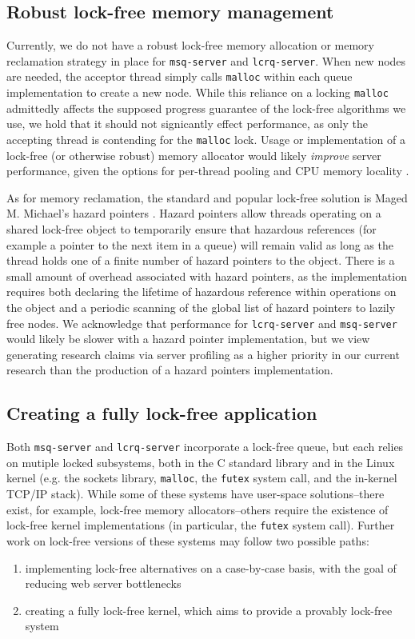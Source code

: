 \documentclass[twoside,10pt]{article}
\begin{document}
\begin{multicols}{2}
\subsection{Robust lock-free memory management}

Currently, we do not have a robust lock-free memory allocation or
memory reclamation strategy in place for \verb+msq-server+ and
\verb+lcrq-server+. When new nodes are needed, the acceptor thread
simply calls \verb+malloc+ within each queue implementation to create
a new node. While this reliance on a locking \verb+malloc+ admittedly
affects the supposed progress guarantee of the lock-free algorithms we
use, we hold that it should not signicantly effect performance, as
only the accepting thread is contending for the \verb+malloc+
lock. Usage or implementation of a lock-free (or otherwise robust)
memory allocator would likely \emph{improve} server performance, given the
options for per-thread pooling and CPU memory locality
\cite{hart2007performance}.

As for memory reclamation, the standard and popular lock-free solution
is Maged M. Michael's hazard pointers \cite{michael2004hazard}. Hazard
pointers allow threads operating on a shared lock-free object to
temporarily ensure that hazardous references (for example a pointer to
the next item in a queue) will remain valid as long as the thread
holds one of a finite number of hazard pointers to the object. There
is a small amount of overhead associated with hazard pointers, as the
implementation requires both declaring the lifetime of hazardous
reference within operations on the object and a periodic scanning of
the global list of hazard pointers to lazily free nodes. We
acknowledge that performance for \verb+lcrq-server+ and
\verb+msq-server+ would likely be slower with a hazard pointer
implementation, but we view generating research claims via server
profiling as a higher priority in our current research than the
production of a hazard pointers implementation.

\subsection{Creating a fully lock-free application}

Both \verb+msq-server+ and \verb+lcrq-server+ incorporate a lock-free
queue, but each relies on mutiple locked subsystems, both in the C
standard library and in the Linux kernel (e.g. the sockets library,
\verb+malloc+, the \verb+futex+ system call, and the in-kernel TCP/IP
stack). While some of these systems have user-space solutions\---there
exist, for example, lock-free memory allocators\---others require the
existence of lock-free kernel implementations (in particular, the
\verb+futex+ system call). Further work on lock-free versions of these
systems may follow two possible paths:
\begin{enumerate}
\item implementing lock-free alternatives on a case-by-case basis,
  with the goal of reducing web server bottlenecks 
\item creating a fully lock-free kernel, which aims to provide a
  provably lock-free system
\end{enumerate}


\end{multicols}
\end{document}
